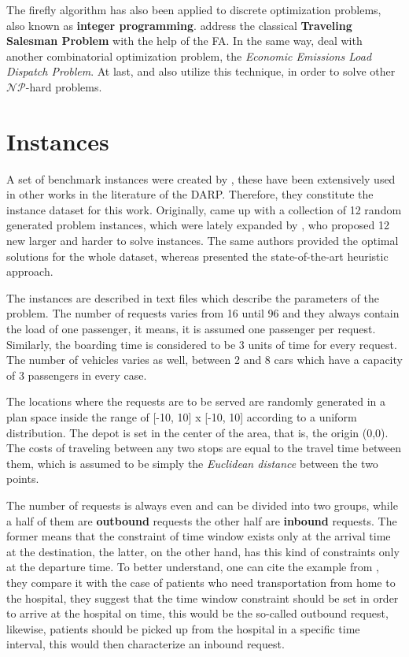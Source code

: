 \documentclass[tuberlin,cic,tc,openright,english,noabntcite,oneside]{iiufrgs}
\begin{document}
The firefly algorithm has also been applied to discrete optimization problems, also known as \textbf{integer programming}. \textcite{jati_evolutionary_2011} address the classical \textbf{Traveling Salesman Problem} with the help of the FA. In the same way, \textcite{apostolopoulos_application_2010} deal with another combinatorial optimization problem, the \emph{Economic Emissions Load Dispatch Problem}. At last, \textcite{sayadi_discrete_2010} and \textcite{sayadi_firefly-inspired_2013} also utilize this technique, in order to solve other $\mathcal{NP}$-hard problems.

\section{Instances}
A set of benchmark instances were created by \textcite{cordeau_branch-and-cut_2006}, these have been extensively used in other works in the literature of the DARP. Therefore, they constitute the instance dataset for this work. Originally, \textcite{cordeau_branch-and-cut_2006} came up with a collection of 12 random generated problem instances, which were lately expanded by \textcite{ropke_models_2007}, who proposed 12 new larger and harder to solve instances. The same authors provided the optimal solutions for the whole dataset, whereas \textcite{parragh_hybrid_2013} presented the state-of-the-art heuristic approach.

The instances are described in text files which describe the parameters of the problem. The number of requests varies from 16 until 96 and they always contain the load of one passenger, it means, it is assumed one passenger per request. Similarly, the boarding time is considered to be 3 units of time for every request. The number of vehicles varies as well, between 2 and 8 cars which have a capacity of 3 passengers in every case.

The locations where the requests are to be served are randomly generated in a plan space inside the range of [-10, 10] x [-10, 10] according to a uniform distribution. The depot is set in the center of the area, that is, the origin (0,0). The costs of traveling between any two stops are equal to the travel time between them, which is assumed to be simply the \emph{Euclidean distance} between the two points.

The number of requests is always even and can be divided into two groups, while a half of them are \textbf{outbound} requests the other half are \textbf{inbound} requests. The former means that the constraint of time window exists only at the arrival time at the destination, the latter, on the other hand, has this kind of constraints only at the departure time. To better understand, one can cite the example from \textcite[p. 29]{cordeau_dial--ride_2007}, they compare it with the case of patients who need transportation from home to the hospital, they suggest that the time window constraint should be set in order to arrive at the hospital on time, this would be the so-called outbound request, likewise, patients should be picked up from the hospital in a specific time interval, this would then characterize an inbound request.
\end{document}
